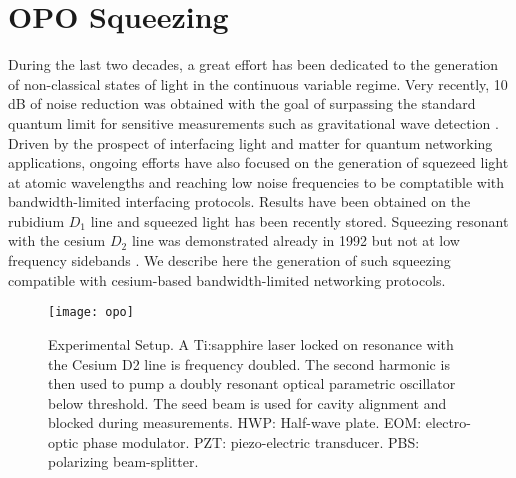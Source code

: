\section{OPO Squeezing}

During the last two decades, a great effort has been dedicated to the generation of non-classical states of light in the continuous variable regime. Very recently, 10 dB of noise reduction was obtained with the goal of surpassing the standard quantum limit for sensitive measurements such as gravitational wave detection \cite{Schnabel}.  Driven by the prospect of interfacing light and matter for quantum networking applications\cite{zoller05,cerf,jeff}, ongoing efforts have also focused on the generation of squezeed light at atomic wavelengths and reaching low noise frequencies to be comptatible with bandwidth-limited interfacing protocols. Results have been obtained on the rubidium $D_1$ line\cite{tanimura,hetet} and squeezed light has been recently stored\cite{honda,appel}. Squeezing resonant with the cesium $D_2$ line was demonstrated already in 1992 but not at low frequency sidebands \cite{polzik}. We describe here the generation of such squeezing compatible with cesium-based bandwidth-limited networking protocols.

\begin{figure}[t!]
\begin{center}
\texttt{[image: opo]}
\end{center}
\caption{Experimental Setup. A Ti:sapphire laser locked on resonance with the Cesium D2 line is frequency doubled. The second harmonic is then used to pump a doubly resonant optical parametric oscillator below threshold.  The seed beam is used for cavity alignment and blocked during measurements. HWP: Half-wave plate. EOM: electro-optic phase modulator. PZT: piezo-electric transducer. PBS: polarizing beam-splitter. 
}\label{setup}
\end{figure}

